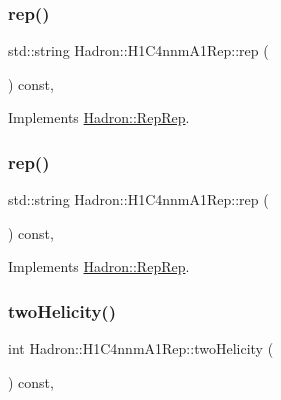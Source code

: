 \subsubsection{\texorpdfstring{rep()}{rep()}\hspace{0.1cm}{\footnotesize\ttfamily [4/5]}}
{\footnotesize\ttfamily std\+::string Hadron\+::\+H1\+C4nnm\+A1\+Rep\+::rep (\begin{DoxyParamCaption}{ }\end{DoxyParamCaption}) const\hspace{0.3cm}{\ttfamily [inline]}, {\ttfamily [virtual]}}



Implements \mbox{\hyperlink{structHadron_1_1RepRep_ab3213025f6de249f7095892109575fde}{Hadron\+::\+Rep\+Rep}}.

\mbox{\label{structHadron_1_1H1C4nnmA1Rep_a66b6495d208ea091b2e8b5e45bf67c29}} 
\subsubsection{\texorpdfstring{rep()}{rep()}\hspace{0.1cm}{\footnotesize\ttfamily [5/5]}}
{\footnotesize\ttfamily std\+::string Hadron\+::\+H1\+C4nnm\+A1\+Rep\+::rep (\begin{DoxyParamCaption}{ }\end{DoxyParamCaption}) const\hspace{0.3cm}{\ttfamily [inline]}, {\ttfamily [virtual]}}



Implements \mbox{\hyperlink{structHadron_1_1RepRep_ab3213025f6de249f7095892109575fde}{Hadron\+::\+Rep\+Rep}}.

\mbox{\label{structHadron_1_1H1C4nnmA1Rep_aea3a7ff3c7439030c6189916e333af31}} 
\subsubsection{\texorpdfstring{twoHelicity()}{twoHelicity()}\hspace{0.1cm}{\footnotesize\ttfamily [1/3]}}
{\footnotesize\ttfamily int Hadron\+::\+H1\+C4nnm\+A1\+Rep\+::two\+Helicity (\begin{DoxyParamCaption}{ }\end{DoxyParamCaption}) const\hspace{0.3cm}{\ttfamily [inline]}, {\ttfamily [virtual]}}

